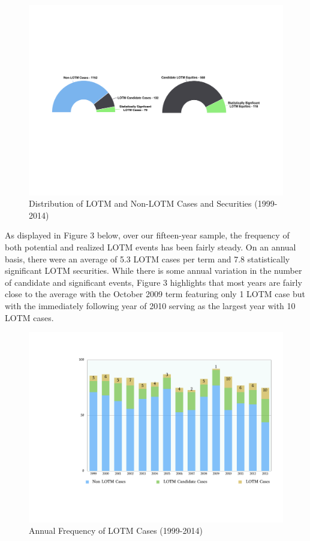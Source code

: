 \documentclass[preprint,12pt]{elsarticle}
\begin{document}
\begin{figure}[h]
\centering
\includegraphics[width=0.9\linewidth]{figure2_event_distribution}
\caption{Distribution of LOTM and Non-LOTM Cases and Securities (1999-2014)}
\label{lotm_candidate_distribution}
\end{figure}

As displayed in Figure 3 below, over our fifteen-year sample, the frequency of both potential and realized LOTM events has been fairly steady.  On an annual basis, there were an average of 5.3 LOTM cases per term and 7.8 statistically significant LOTM securities.  While there is some annual variation in the number of candidate and significant events, Figure 3 highlights that most years are fairly close to the average with the October 2009 term featuring only 1 LOTM case but with the immediately following year of 2010 serving as the largest year with 10 LOTM cases.  
\begin{figure}[h]
\centering
\includegraphics[width=0.9\linewidth]{figure3_annual_events}
\caption{Annual Frequency of LOTM Cases (1999-2014)}
\label{lotm_event_frequency}
\end{figure}
\end{document}
